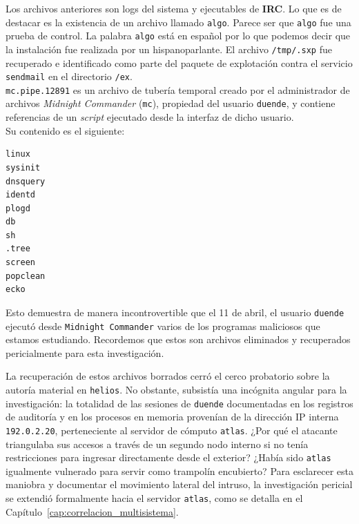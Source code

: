  Los archivos anteriores son logs del sistema y ejecutables de \textbf{IRC}. Lo
que es de destacar es la existencia de un archivo llamado \texttt{algo}.
Parece ser que \texttt{algo} fue una prueba de control. La palabra \texttt{algo}
está en español por lo que podemos decir que la instalación fue realizada
por un hispanoparlante. El archivo \texttt{/tmp/.sxp} fue recuperado e identificado
como parte del paquete de explotación contra el servicio \texttt{sendmail} en el directorio \texttt{/ex}.\\
 

 \texttt{mc.pipe.12891} es un archivo de tubería temporal creado por el administrador de archivos \textit{Midnight Commander} (\texttt{mc}), propiedad del usuario \texttt{duende}, y contiene referencias de un \textit{script} ejecutado desde la interfaz de dicho usuario.\\

 Su contenido es el siguiente:
 
\vspace{1em}

{\footnotesize
\begin{lstlisting}[style=terminal]
linux
sysinit
dnsquery
identd
plogd
db
sh
.tree
screen
popclean
ecko
\end{lstlisting}
}

\vspace{1em}

 Esto demuestra de manera incontrovertible que el 11 de abril, el usuario \texttt{duende}
ejecutó desde \texttt{Midnight Commander} varios de los programas maliciosos que
estamos estudiando. Recordemos que estos son archivos eliminados y
recuperados pericialmente para esta investigación.

La recuperación de estos archivos borrados cerró el cerco probatorio sobre la autoría material en \texttt{helios}. No obstante, subsistía una incógnita angular para la investigación: la totalidad de las sesiones de \texttt{duende} documentadas en los registros de auditoría y en los procesos en memoria provenían de la dirección IP interna \texttt{192.0.2.20}, perteneciente al servidor de cómputo \texttt{atlas}. ¿Por qué el atacante triangulaba sus accesos a través de un segundo nodo interno si no tenía restricciones para ingresar directamente desde el exterior? ¿Había sido \texttt{atlas} igualmente vulnerado para servir como trampolín encubierto? Para esclarecer esta maniobra y documentar el movimiento lateral del intruso, la investigación pericial se extendió formalmente hacia el servidor \texttt{atlas}, como se detalla en el Capítulo~\ref{cap:correlacion_multisistema}.

